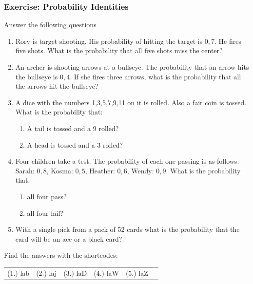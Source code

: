             \subsubsection{ Exercise: Probability Identities
}
            \nopagebreak
      \label{m39377*id114484}Answer the following questions \par 
      \label{m39377*id114495}\begin{enumerate}[noitemsep, label=\textbf{\arabic*}. ] 
            \label{m39377*uid60}\item Rory is target shooting. His probability of hitting the target is
$0,7$. He fires five shots. What is the probability
that all five shots miss the center?\newline
            \label{m39377*uid63}\item An archer is shooting arrows at a bullseye. The
probability that an arrow hits the bullseye is
$0,4$. If she fires three arrows, what is the
probability that all the arrows hit the bullseye?\newline
            \label{m39377*uid66}\item A dice with the numbers 1,3,5,7,9,11 on it is rolled.
Also a fair coin is tossed. What is the probability that:
\label{m39377*id114596}\begin{enumerate}[noitemsep, label=\textbf{\alph*}. ] 
            \label{m39377*uid69}\item A tail is tossed and a 9 rolled?
\label{m39377*uid70}\item A head is tossed and a 3 rolled?
\end{enumerate}
                \label{m39377*uid71}\item Four children take a test. The probability of each one
passing is as follows. Sarah: $0,8$, Kosma:
$0,5$, Heather: \begin{math}0,6\end{math},
Wendy: $0,9$. What is the probability that:
\label{m39377*id114667}\begin{enumerate}[noitemsep, label=\textbf{\alph*}. ] 
            \label{m39377*uid72}\item all four pass?
\label{m39377*uid73}\item all four fail?
\end{enumerate}
                \label{m39377*uid75}\item With a single pick from a pack of 52 cards what is the
probability that the card will be an ace or a black card?\newline
\end{enumerate}
    \label{m39377*cid8}
\par {} Find the answers with the shortcodes:
 \par \begin{tabular}[h]{cccccc}
 (1.) lab  &  (2.) laj  &  (3.) laD  &  (4.) laW  &  (5.) laZ  & \end{tabular}
